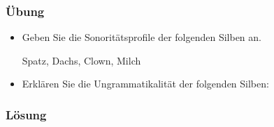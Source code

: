 {
\begin{frame}
\frametitle{Übung}

\begin{itemize}
	\item Geben Sie die Sonoritätsprofile der folgenden Silben an.
	
	\ea Spatz, Dachs, Clown, Milch
	\z
	
	
	
	\item Erklären Sie die Ungrammatikalität der folgenden Silben:
	
	\begin{exe}
	\ex \label{ex:lbat}
	\begin{xlist}
		\ex [*]{\textipa{[lbat]}}
		\ex [*]{\textipa{[blabl]}}
		\ex [*]{\textipa{[ki:l\textscr]}}
		\ex [*]{\textipa{[ngang]}}
		\ex [*]{\textipa{[krafm]}}
		\ex [*]{\textipa{[elat]}}
		\ex [*]{\textipa{[plaml]}}
		\ex [*]{\textipa{[nfatl]}}
	\end{xlist}
\end{exe}
	
\end{itemize}

\end{frame}


\begin{frame}
\frametitle{Lösung}


\end{frame}}
